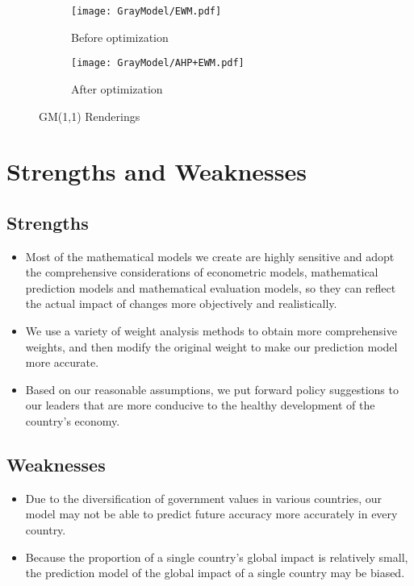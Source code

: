 \documentclass[12pt]{article}
\begin{document}
	
	\begin{figure}[htbp]
		\begin{subfigure}[b]{0.5\textwidth}
			\centering
			\texttt{[image: GrayModel/EWM.pdf]}
			\caption{Before optimization}\label{fig:BO}
		\end{subfigure}
		\begin{subfigure}[b]{0.5\textwidth}
			\centering
			\texttt{[image: GrayModel/AHP+EWM.pdf]}
			\caption{After optimization}\label{fig:AO}
		\end{subfigure}
		\caption{GM(1,1) Renderings}\label{}
	\end{figure}
	
	
	\newpage
	
	\section{Strengths and Weaknesses} %
	\subsection*{Strengths} %
	\begin{itemize}
		\item Most of the mathematical models we create are highly sensitive and adopt the comprehensive considerations of econometric models, mathematical prediction models and mathematical evaluation models, so they can reflect the actual impact of changes more objectively and realistically.
		\item We use a variety of weight analysis methods to obtain more comprehensive weights, and then modify the original weight to make our prediction model more accurate.
		\item Based on our reasonable assumptions, we put forward policy suggestions to our leaders that are more conducive to the healthy development of the country's economy.
	\end{itemize}
	
	\subsection*{Weaknesses} %
	\begin{itemize}
		\item Due to the diversification of government values in various countries, our model may not be able to predict future accuracy more accurately in every country.
		\item Because the proportion of a single country's global impact is relatively small, the prediction model of the global impact of a single country may be biased.
	\end{itemize}
	
\end{document}
